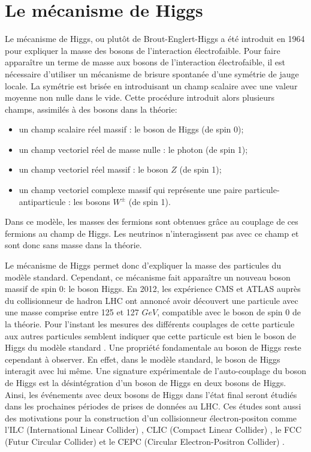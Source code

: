 \section{Le mécanisme de Higgs}
\label{sec.higgs}
Le mécanisme de Higgs, ou plutôt de Brout-Englert-Higgs a été introduit en 1964 pour expliquer la masse des bosons de l'interaction électrofaible. Pour faire apparaître un terme de masse aux bosons de l'interaction électrofaible, il est nécessaire d'utiliser un mécanisme de brisure spontanée d'une symétrie de jauge locale. La symétrie est brisée en introduisant un champ scalaire avec une valeur moyenne non nulle dans le vide. Cette procédure introduit alors plusieurs champs, assimilés à des bosons dans la théorie:
\begin{itemize}
\item un champ scalaire réel massif : le boson de Higgs (de spin 0);
\item un champ vectoriel réel de masse nulle : le photon (de spin 1);
\item un champ vectoriel réel massif : le boson $Z$ (de spin 1);
\item un champ vectoriel complexe massif qui représente une paire particule-antiparticule : les bosons $W^\pm$ (de spin 1).
\end{itemize}
Dans ce modèle, les masses des fermions sont obtenues grâce au couplage de ces fermions au champ de Higgs. Les neutrinos n'interagissent pas avec ce champ et sont donc sans masse dans la théorie. 

Le mécanisme de Higgs permet donc d'expliquer la masse des particules du modèle standard. Cependant, ce mécanisme fait apparaître un nouveau boson massif de spin 0: le boson Higgs. En 2012, les expérience CMS et ATLAS auprès du collisionneur de hadron LHC ont annoncé avoir découvert une particule avec une masse comprise entre 125 et 127 $GeV$, compatible avec le boson de spin 0 de la théorie. Pour l'instant les mesures des différents couplages de cette particule aux autres particules semblent indiquer que cette particule est bien le boson de Higgs du modèle standard \cite{CMS-PAS-HIG-14-009}. Une propriété fondamentale au boson de Higgs reste cependant à observer. En effet, dans le modèle standard, le boson de Higgs interagit avec lui même. Une signature expérimentale de l'auto-couplage du boson de Higgs est la désintégration d'un boson de Higgs en deux bosons de Higgs. Ainsi, les événements avec deux bosons de Higgs dans l'état final seront étudiés dans les prochaines périodes de prises de données au LHC. Ces études sont aussi des motivations pour la construction d'un collisionneur électron-positon comme l'ILC (International Linear Collider) \cite{introTDR}, CLIC (Compact Linear Collider) \cite{clic}, le FCC (Futur Circular Collider) \cite{fcc-ee} et le CEPC (Circular Electron-Positron Collider) \cite{cepc}.


